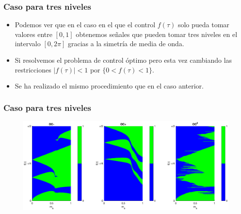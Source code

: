 \begin{frame}
    \frametitle{Caso para tres niveles}
    \begin{itemize}
        \item Podemos ver que en el caso en el que el control $f(\tau)$ solo pueda tomar valores entre $[0,1]$ obtenemos señales que pueden tomar tres niveles en el intervalo $[0,2\pi]$ gracias a la simetría de media de onda.
        \item Si resolvemos el problema de control óptimo pero esta vez cambiando las restricciones $|f(\tau)|<1$ por $\{0<f(\tau)<1\}$.
        \item Se ha realizado el mismo procedimiento que en el caso anterior.
    
    \end{itemize}

\end{frame}
\begin{frame}
    \frametitle{Caso para tres niveles}
    \begin{figure}
        \centering
        \includegraphics[scale=0.325]{../D0002-FullReport/img/EX01_surf_3LVL.eps}
    \end{figure}
    
\end{frame}
